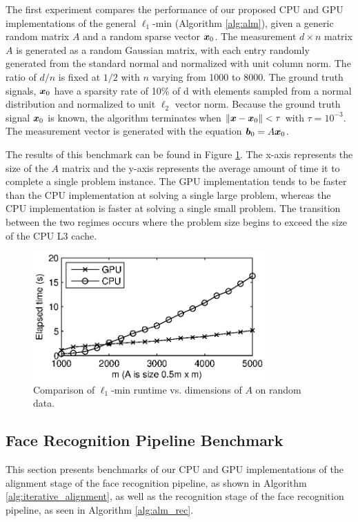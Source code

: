 \documentclass[10pt,twocolumn,letterpaper]{article}
\begin{document}
The first experiment compares the performance of our proposed CPU and GPU
implementations of the general $\ell_1$-min (Algorithm \eqref{alg:alm}), given a
generic random matrix $A$ and a random sparse vector ${\boldsymbol{x}}_0$.  The measurement
$d \times n$ matrix $A$ is generated as a random Gaussian matrix, with each
entry randomly generated from the standard normal and normalized with unit
column norm.  The ratio of $d/n$ is fixed at $1/2$ with $n$ varying from 1000 to 8000.
The ground truth signals, ${\boldsymbol{x}}_0$ have a sparsity rate of 10\% of d with
elements sampled from a normal distribution and normalized to unit $\ell_2$ vector
norm.  Because the ground truth signal ${\boldsymbol{x}}_0$ is known, the algorithm
terminates when $\|{\boldsymbol x}-{\boldsymbol x}_0\| < \tau$ with $\tau=10^{-3}$.  The measurement
vector is generated with the equation ${\boldsymbol{b}}_0 = A {\boldsymbol{x}}_0$.   

The results of this benchmark can be found in Figure \ref{fig:random_data}.
The x-axis represents the size of the $A$ matrix and the y-axis represents the
average amount of time it to complete a single problem instance.  The GPU
implementation tends to be faster than the CPU implementation at solving a
single large problem, whereas the CPU implementation is faster at solving a
single small problem.  The transition between the two regimes occurs where
the problem size begins to exceed the size of the CPU L3 cache. 
\begin{figure}
\begin{center}
\includegraphics[width=3.5in]{figures/time_vs_matrix_size_constant_tol}
\end{center}
\caption{Comparison of $\ell_1$-min runtime vs. dimensions of $A$ on random data.}
\label{fig:random_data}
\end{figure}

\subsection{Face Recognition Pipeline Benchmark} 
\label{sec:benchmark}
This section presents benchmarks of our CPU and GPU implementations of the
alignment stage of the face recognition pipeline, as shown in Algorithm
\ref{alg:iterative_alignment}, as well as the recognition stage of the
face recognition pipeline, as seen in Algorithm \ref{alg:alm_rec}.
\end{document}
